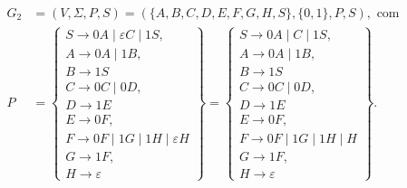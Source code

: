 \documentclass[12pt]{article}
\def\myling{{99}} %
\begin{document}
\begin{tcolorbox}[breakable,rounded corners, colback=yellow!5, colframe=red!40!black, title={Gramática $G_2$ que gera as cadeias da linguagem $\mathcal{L}_{\myling}$}]
 \begin{align*}
 G_2 &=(V,\Sigma,P,S)=(\{A,B,C,D,E,F,G,H,S\},\{0,1\},P,S), \text{ com}\\
   P &=
   \left\{\begin{array}{l}
    S \to 0A \mid \varepsilon C \mid 1S,\\
    A \to 0A \mid 1B,\\
    B \to 1S\\
    C \to 0C \mid 0D,\\
    D \to 1E\\
    E \to 0F,\\
    F \to 0F \mid 1G \mid 1H \mid \varepsilon H\\
    G \to 1F,\\
    H \to \varepsilon
   \end{array}\right\}
   =
   \left\{\begin{array}{l}
    S \to 0A \mid C \mid 1S,\\
    A \to 0A \mid 1B,\\
    B \to 1S\\
    C \to 0C \mid 0D,\\
    D \to 1E\\
    E \to 0F,\\
    F \to 0F \mid 1G \mid 1H \mid H\\
    G \to 1F,\\
    H \to \varepsilon
   \end{array}\right\}.
 \end{align*}
\end{tcolorbox}\bigskip
\end{document}
